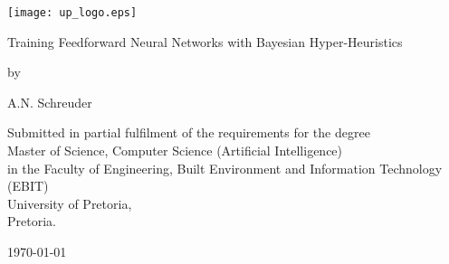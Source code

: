 \pagestyle{empty}
\begin{titlepage}
    \begin{center}
        \texttt{[image: up\_logo.eps]}
        \vspace{2cm}

        \Huge
        \textsf{Training Feedforward Neural Networks with Bayesian
        Hyper-Heuristics}
        \vspace{1cm}

        \large
        \textsf{by}
        \vspace{1cm}

        \large
        \textsf{A.N. Schreuder}
        \vfill

        \normalsize
        \textsf{
            Submitted in partial fulfilment of the requirements for the degree\\
            Master of Science, Computer Science (Artificial Intelligence)\\
            in the Faculty of Engineering, Built Environment and Information
            Technology (EBIT)\\
            University of Pretoria,\\
            Pretoria.
        }
        \vspace{2cm}

        \normalsize
        \textsf{\monthyeardate\today}
    \end{center}
\end{titlepage}
\newpage

